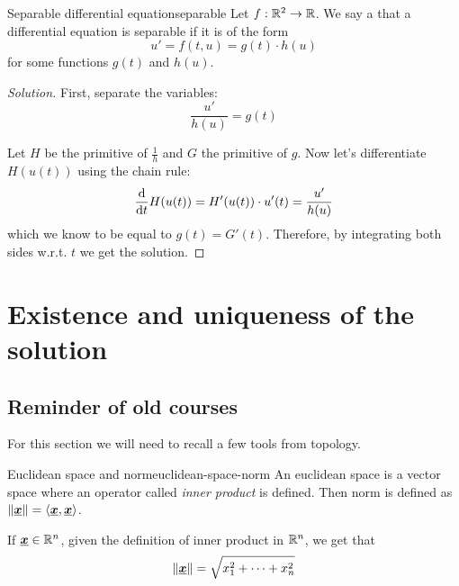 \documentclass[12pt]{extarticle}
\renewcommand{\vec}[1]{\uvec{#1}}
\begin{document}
\begin{definition}{Separable differential equation}{separable}
    Let $f: \mathbb{R}^2 \to \mathbb{R}$.
    We say a that a differential equation is separable if it is of the form
    \begin{equation}
        u' = f(t, u) = g(t) \cdot h(u)
    \end{equation}
    for some functions $g(t)$ and $h(u)$.
\end{definition}

\begin{proof}[Solution]
    First, separate the variables:
    \begin{equation}
        \frac{u'}{h(u)} = g(t)
    \end{equation}

    Let $H$ be the primitive of $\frac{1}{h}$ and $G$ the primitive of $g$.
    Now let's differentiate $H(u(t))$ using the chain rule:
    \begin{equation}
        \dv{t} H(u(t)) = H'(u(t)) \cdot u'(t) = \frac{u'}{h(u)}
    \end{equation}
    which we know to be equal to $g(t) = G'(t)$.
    Therefore, by integrating both sides w.r.t. $t$ we get the solution.
\end{proof}

\section{Existence and uniqueness of the solution}

\subsection{Reminder of old courses}

For this section we will need to recall a few tools from topology.

\begin{definition}{Euclidean space and norm}{euclidean-space-norm}
    An euclidean space is a vector space where an operator called \textit{inner product} is defined.
    Then norm is defined as $\norm{\vec x} = \langle \vec x, \vec x \rangle$.

    If $\vec x \in \R^n$, given the definition of inner product in $\mathbb{R}^n$, we get that
    \begin{equation}
        \norm{\vec x} = \sqrt{x_1^2 + \dots + x_n^2}
    \end{equation}
\end{definition}
\end{document}
